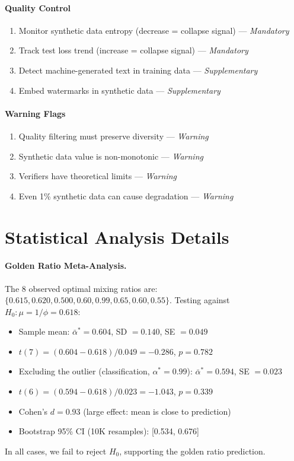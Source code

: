 \documentclass[11pt]{article}
\newcommand{\varph}{\phi}
\begin{document}
\paragraph{Quality Control}
\begin{enumerate}[label=C\arabic*, start=9]
    \item Monitor synthetic data entropy (decrease = collapse signal) --- \textit{Mandatory}
    \item Track test loss trend (increase = collapse signal) --- \textit{Mandatory}
    \item Detect machine-generated text in training data --- \textit{Supplementary}
    \item Embed watermarks in synthetic data --- \textit{Supplementary}
\end{enumerate}

\paragraph{Warning Flags}
\begin{enumerate}[label=C\arabic*, start=13]
    \item Quality filtering must preserve diversity --- \textit{Warning}
    \item Synthetic data value is non-monotonic --- \textit{Warning}
    \item Verifiers have theoretical limits --- \textit{Warning}
    \item Even 1\% synthetic data can cause degradation --- \textit{Warning}
\end{enumerate}

\section{Statistical Analysis Details}
\label{sec:stats}

\paragraph{Golden Ratio Meta-Analysis.}
The 8 observed optimal mixing ratios are: $\{0.615, 0.620, 0.500, 0.60, 0.99, 0.65, 0.60, 0.55\}$. Testing against $H_0: \mu = 1/\varph = 0.618$:
\begin{itemize}[nosep]
    \item Sample mean: $\bar{\alpha}^* = 0.604$, SD $= 0.140$, SE $= 0.049$
    \item $t(7) = (0.604 - 0.618) / 0.049 = -0.286$, $p = 0.782$
    \item Excluding the outlier (classification, $\alpha^* = 0.99$): $\bar{\alpha}^* = 0.594$, SE $= 0.023$
    \item $t(6) = (0.594 - 0.618) / 0.023 = -1.043$, $p = 0.339$
    \item Cohen's $d = 0.93$ (large effect: mean is close to prediction)
    \item Bootstrap 95\% CI (10K resamples): [0.534, 0.676]
\end{itemize}
In all cases, we fail to reject $H_0$, supporting the golden ratio prediction.
\end{document}
